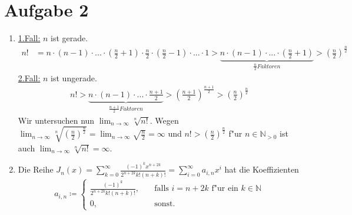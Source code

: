\documentclass[a4paper, landscape,twocolumn,8pt]{scrartcl}
\theoremstyle{plain}
\begin{document}
\section*{Aufgabe 2}
\begin{enumerate}[label=(\roman*)]
    \item \underline{1.Fall:} $n$ ist gerade. 
    \begin{align*}
        n! &= n \cdot (n-1) \cdot ... \cdot (\frac{n}{2}+1) \cdot \frac{n}{2} \cdot (\frac{n}{2}-1) \cdot ... \cdot 1 > \underbrace{n \cdot (n-1) \cdot ... \cdot (\frac{n}{2}+1)}_{\frac{n}{2} Faktoren} > (\frac{n}{2})^{\frac{n}{2}}
    \end{align*}
    \underline{2.Fall:} $n$ ist ungerade. 
    \begin{align*}
        n! > \underbrace{n \cdot (n-1) \cdot ... \cdot \frac{n+1}{2}}_{\frac{n+1}{2} Faktoren} > (\frac{n+1}{2})^{\frac{n+1}{2}} > (\frac{n}{2})^{\frac{n}{2}}
    \end{align*}
    Wir untersuchen nun $\lim_{n \to \infty} \sqrt[n]{n!}$. Wegen $\lim_{n \to \infty} \sqrt[n]{(\frac{n}{2})^{\frac{n}{2}}} = \lim_{n \to \infty}\sqrt{\frac{n}{2}} = \infty$ und $n! > (\frac{n}{2})^{\frac{n}{2}}$ f"ur $n \in \mathbb N_{>0}$ ist auch $\lim_{n \to \infty} \sqrt[n]{n!} = \infty$.
    \item Die Reihe $J_n(x) = \sum^{\infty}_{k=0}\frac{(-1)^kx^{n+2k}}{2^{n+2k}k!(n+k)!} = \sum^{\infty}_{i=0}a_{i,n}x^i$ hat die Koeffizienten 
    \[
        a_{i,n} \coloneqq \begin{cases}
                            \frac{(-1)^k}{2^{n+2k}k!(n+k)!}, \quad &\text{falls $i = n+2k$ f"ur ein $k \in \mathbb N$} \\
                            0, \quad &\text{sonst.}
                        \end{cases}
    \]
    

\end{enumerate}
\end{document}
